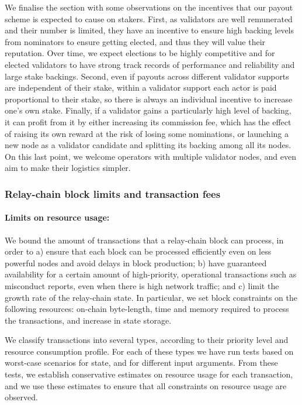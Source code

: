 We finalise the section with some observations on the incentives that our payout scheme is expected to cause on stakers. 
First, as validators are well remunerated and their number is limited, 
they have an incentive to ensure high backing levels from nominators to ensure getting elected, 
and thus they will value their reputation. Over time, we expect elections to be highly competitive 
and for elected validators to have strong track records of performance and reliability and large stake backings.
Second, even if payouts across different validator supports are independent of their stake, 
within a validator support each actor is paid proportional to their stake, 
so there is always an individual incentive to increase one's own stake. 
Finally, if a validator gains a particularly high level of backing, it can profit from it by either increasing 
its commission fee, which has the effect of raising its own reward at the risk of losing some nominations, 
or launching a new node as a validator candidate and splitting its backing among all its nodes. 
On this last point, we welcome operators with multiple validator nodes, 
and even aim to make their logistics simpler. 


\subsubsection{Relay-chain block limits and transaction fees}

\paragraph{Limits on resource usage:} We bound the amount of transactions that a relay-chain block can process, 
in order to a) ensure that each block can be processed efficiently even on less powerful nodes and avoid delays in block production; b) have guaranteed availability for a certain amount of high-priority, operational transactions such as misconduct reports, even when there is high network traffic; and c) limit the growth rate of the relay-chain state. 
In particular, we set block constraints on the following resources: on-chain byte-length, 
time and memory required to process the transactions, and increase in state storage.

We classify transactions into several types, according to their priority level and resource consumption profile. 
For each of these types we have run tests based on worst-case scenarios for state, and for different input arguments. 
From these tests, we establish conservative estimates on resource usage for each transaction, and we use these estimates to ensure that all constraints on resource usage are observed.

